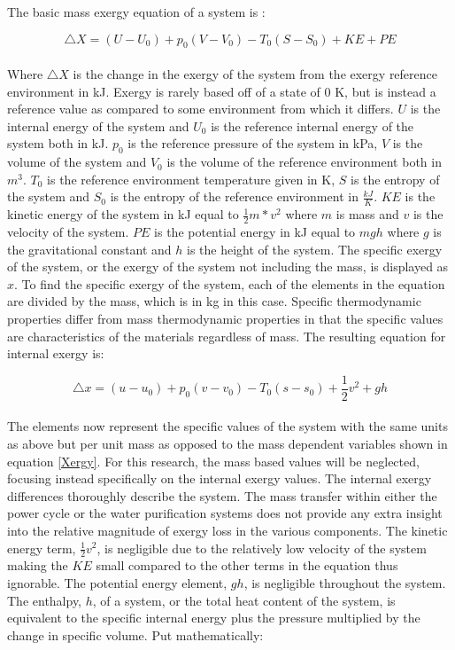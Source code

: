 The basic mass exergy equation of a system is \cite{moran2010fundamentals}:

\begin{equation}
\triangle X=(U-U_0)+p_0(V-V_0)-T_0(S-S_0)+KE+PE
\label{Xergy}
\end{equation}
\\
Where $\triangle X$ is the change in the exergy of the system from the exergy reference environment in kJ.  Exergy is rarely based off of a state of 0 K, but is instead a reference value as compared to some environment from which it differs. $U$ is the internal energy of the system and $U_0$ is the reference internal energy of the system both in kJ. $p_0$ is the reference pressure of the system in kPa, $V$ is the volume of the system and $V_0$ is the volume of the reference environment both in $m^3$. $T_0$ is the reference environment temperature given in K, $S$ is the entropy of the system and $S_0$ is the entropy of the reference environment in $\frac{kJ}{K}$. $KE$ is the kinetic energy of the system in kJ equal to $\frac{1}{2}m*v^2$ where $m$ is mass and $v$ is the velocity of the system. $PE$ is the potential energy in kJ equal to $mgh$ where $g$ is the gravitational constant and $h$ is the height of the system. The specific exergy of the system, or the exergy of the system not including the mass, is displayed as $x$.  To find the specific exergy of the system, each of the elements in the equation are divided by the mass, which is in kg in this case. Specific thermodynamic properties differ from mass thermodynamic properties in that the specific values are characteristics of the materials regardless of mass. The resulting equation for internal exergy is:

\begin{equation}
\label{specificX}
\triangle x=(u-u_0)+p_0(v-v_0)-T_0(s-s_0)+\frac{1}{2}v^2+gh
\end{equation}
\\

The elements now represent the specific values of the system with the same units as above but per unit mass as opposed to the mass dependent variables shown in equation \ref{Xergy}.  For this research, the mass based values will be neglected, focusing instead specifically on the internal exergy values. The internal exergy differences thoroughly describe the system.  The mass transfer within either the power cycle or the water purification systems does not provide any extra insight into the relative magnitude of exergy loss in the various components. The kinetic energy term, $\frac{1}{2}v^2$, is negligible due to the relatively low velocity of the system making the $KE$ small compared to the other terms in the equation thus ignorable.  The potential energy element, $gh$, is negligible throughout the system. The enthalpy, $h$, of a system, or the total heat content of the system, is equivalent to the specific internal energy plus the pressure multiplied by the change in specific volume.  Put mathematically:


